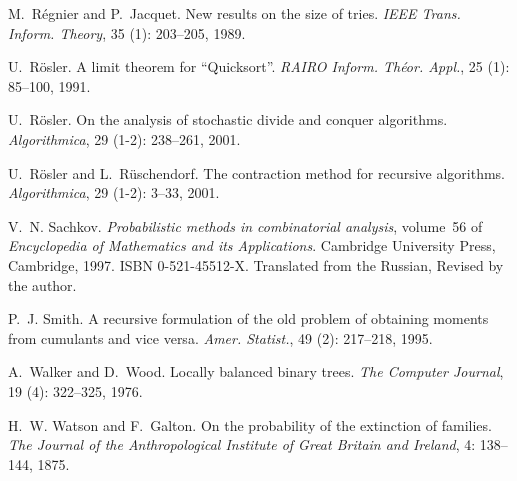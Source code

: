 \documentclass[11pt]{article}
\numberwithin{theorem}{section}
\theoremstyle{definition}
\numberwithin{equation}{section}
\begin{document}
\begin{thebibliography}{55}
M.~R\'egnier and P.~Jacquet.
\newblock New results on the size of tries.
\newblock \emph{IEEE Trans. Inform. Theory}, 35 (1):
  203--205, 1989.

U.~R\"osler.
\newblock A limit theorem for ``{Q}uicksort''.
\newblock \emph{RAIRO Inform. Th\'eor. Appl.}, 25 (1):
  85--100, 1991.

U.~R\"osler.
\newblock On the analysis of stochastic divide and conquer algorithms.
\newblock \emph{Algorithmica}, 29 (1-2): 238--261, 2001.

U.~R\"osler and L.~R\"uschendorf.
\newblock The contraction method for recursive algorithms.
\newblock \emph{Algorithmica}, 29 (1-2): 3--33, 2001.

V.~N. Sachkov.
\newblock \emph{Probabilistic methods in combinatorial analysis}, volume~56 of
  \emph{Encyclopedia of Mathematics and its Applications}.
\newblock Cambridge University Press, Cambridge, 1997.
\newblock ISBN 0-521-45512-X.
\newblock Translated from the Russian, Revised by the author.

P.~J. Smith.
\newblock A recursive formulation of the old problem of obtaining moments from
  cumulants and vice versa.
\newblock \emph{Amer. Statist.}, 49 (2): 217--218, 1995.

A.~Walker and D.~Wood.
\newblock Locally balanced binary trees.
\newblock \emph{The Computer Journal}, 19 (4): 322--325,
  1976.

H.~W. Watson and F.~Galton.
\newblock On the probability of the extinction of families.
\newblock \emph{The Journal of the Anthropological Institute of Great Britain
  and Ireland}, 4: 138--144, 1875.

\end{thebibliography}


%
\end{document}
